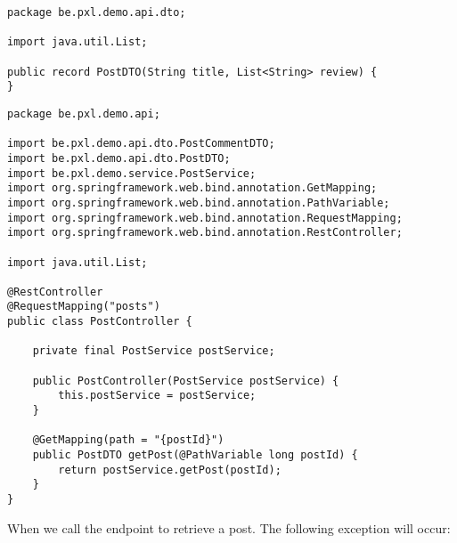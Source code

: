 \begin{lstlisting}
package be.pxl.demo.api.dto;

import java.util.List;

public record PostDTO(String title, List<String> review) {
}
\end{lstlisting}


\begin{lstlisting}
package be.pxl.demo.api;

import be.pxl.demo.api.dto.PostCommentDTO;
import be.pxl.demo.api.dto.PostDTO;
import be.pxl.demo.service.PostService;
import org.springframework.web.bind.annotation.GetMapping;
import org.springframework.web.bind.annotation.PathVariable;
import org.springframework.web.bind.annotation.RequestMapping;
import org.springframework.web.bind.annotation.RestController;

import java.util.List;

@RestController
@RequestMapping("posts")
public class PostController {

    private final PostService postService;

    public PostController(PostService postService) {
        this.postService = postService;
    }

    @GetMapping(path = "{postId}")
    public PostDTO getPost(@PathVariable long postId) {
        return postService.getPost(postId);
    }
}
\end{lstlisting}


When we call the endpoint to retrieve a post. The following exception will occur:

